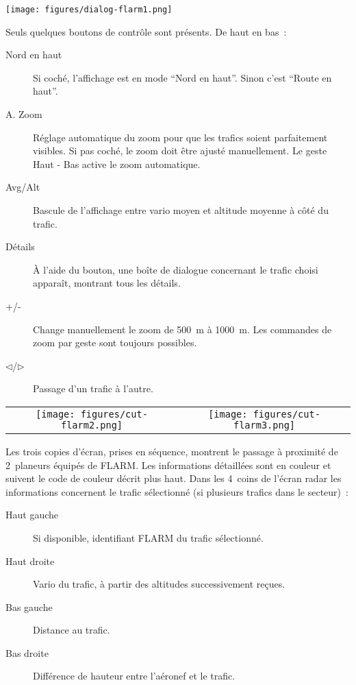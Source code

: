 \begin{center}
\texttt{[image: figures/dialog-flarm1.png]}
\end{center}

Seuls quelques boutons de contrôle sont présents. De haut en bas~:
\begin{description}
\item[Nord en haut] Si coché, l'affichage est en mode ``Nord en haut''. Sinon c'est ``Route en haut''.
\item[A. Zoom]  Réglage automatique du zoom pour que les trafics soient parfaitement visibles. Si pas coché, le zoom doit être ajusté manuellement. Le geste Haut - Bas active le zoom automatique.
\item[Avg/Alt]  Bascule de l'affichage entre vario moyen et altitude moyenne à côté du trafic.
\item[Détails]  À l'aide du bouton, une boîte de dialogue concernant le trafic choisi apparaît, montrant tous les détails.
\item[+/-]  Change manuellement le zoom de 500~m à 1000~m. Les commandes de zoom par geste sont toujours possibles.
\item[$\triangleleft$/$\triangleright$]  Passage d'un trafic à l'autre.
\end{description}

\begin{center}
\begin{tabular}{c c}
\texttt{[image: figures/cut-flarm2.png]}&
\texttt{[image: figures/cut-flarm3.png]}\\
\end{tabular}
\end{center}
Les trois copies d'écran, prises en séquence, montrent le passage à proximité de 2~planeurs équipés de FLARM. Les informations détaillées sont en couleur et suivent le code de couleur décrit plus haut.
Dans les 4~coins de l'écran radar les informations concernent le trafic sélectionné (si plusieurs trafics dans le secteur)~:
\begin{description}
\item[Haut gauche] Si disponible, identifiant FLARM du trafic sélectionné.
\item[Haut droite] Vario du trafic, à partir des altitudes successivement reçues.
\item[Bas gauche] Distance au trafic.
\item[Bas droite] Différence de hauteur entre l'aéronef et le trafic. 
\end{description}

